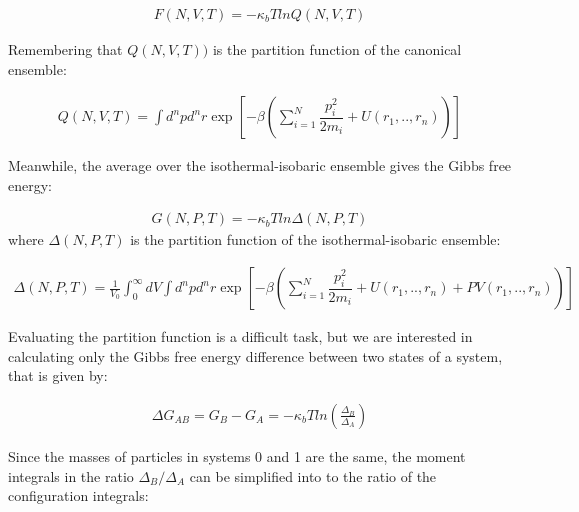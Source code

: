 	\begin{equation}
	\label{eq:fcano}
	\begin{aligned}
	F(N,V,T) = -\kappa_{b}T ln Q(N,V,T)
	\end{aligned}
	\end{equation}
	
	Remembering that $Q(N,V,T))$ is the partition function of the canonical ensemble:
	
	\begin{equation}
	\label{eq:partican}
	\begin{aligned}
	Q(N,V,T) = \int d^{n}p d^{n}r \exp \left[ -\beta \left( \sum_{i=1}^{N}\dfrac{p_{i}^{2}}{2m_{i}} + U(r_{1},..,r_{n}) \right)
	\right]
	\end{aligned}
	\end{equation}
	
	Meanwhile, the average over the isothermal-isobaric ensemble gives the Gibbs free energy:
	
	\begin{equation}
	\label{eq:fisobari}
	\begin{aligned}
	G(N,P,T) = -\kappa_{b}T ln \Delta (N,P,T)
	\end{aligned}
	\end{equation}
	where $\Delta (N,P,T)$ is the partition function of the isothermal-isobaric ensemble:
	
	\begin{equation}
	\label{eq:partiso}
	\begin{aligned}
	\Delta (N,P,T) = \frac{1}{V_{0}} \int_{0}^{\infty} dV \int d^{n}p d^{n}r \exp \left[ -\beta \left( \sum_{i=1}^{N}\dfrac{p_{i}^{2}}{2m_{i}} + U(r_{1},..,r_{n}) + PV(r_{1},..,r_{n}) \right) \right]
	\end{aligned}
	\end{equation}
	
	Evaluating the partition function is a difficult task, but we are interested in calculating only the Gibbs free energy difference between two states of a system, that is given by: 
	
	\begin{equation}
	\label{eq:dif}
	\begin{aligned}
	\Delta G_{AB} = G_{B} - G_{A}= -\kappa_{b}T ln \left( \frac{\Delta_{B}}{\Delta_{A}}\right) 
	\end{aligned}
	\end{equation}
	
	Since the masses of particles in systems 0 and 1 are the same, the moment integrals in the ratio ${\Delta_{B}}/{\Delta_{A}}$ can be simplified into to the ratio of the configuration integrals:
	
